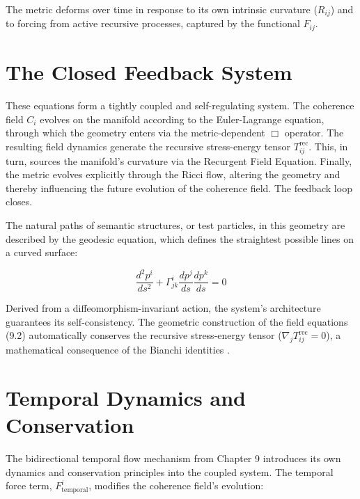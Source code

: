 The metric deforms over time in response to its own intrinsic curvature (\(R_{ij}\)) and to forcing from active recursive processes, captured by the functional \(F_{ij}\).


\section{The Closed Feedback System}
\label{10.4:the_closed_feedback_system}

These equations form a tightly coupled and self-regulating system. The coherence field \(C_i\) evolves on the manifold according to the Euler-Lagrange equation, through which the geometry enters via the metric-dependent \(\Box\) operator. The resulting field dynamics generate the recursive stress-energy tensor \(T^{\text{rec}}_{ij}\). This, in turn, sources the manifold's curvature via the Recurgent Field Equation. Finally, the metric evolves explicitly through the Ricci flow, altering the geometry and thereby influencing the future evolution of the coherence field. The feedback loop closes.

The natural paths of semantic structures, or test particles, in this geometry are described by the geodesic equation, which defines the straightest possible lines on a curved surface:

\begin{equation}
\frac{d^2 p^i}{ds^2} + \Gamma^i_{jk} \frac{dp^j}{ds} \frac{dp^k}{ds} = 0
\end{equation}

Derived from a diffeomorphism-invariant action, the system's architecture guarantees its self-consistency. The geometric construction of the field equations (9.2) automatically conserves the recursive stress-energy tensor ($\nabla_j T^{\text{rec}}_{ij} = 0$), a mathematical consequence of the Bianchi identities \autocite{Bianchi1902}.


\section{Temporal Dynamics and Conservation}
\label{10.5:temporal_dynamics_and_conservation}

The bidirectional temporal flow mechanism from Chapter 9 introduces its own dynamics and conservation principles into the coupled system. The temporal force term, \(F^i_{\text{temporal}}\), modifies the coherence field's evolution:

